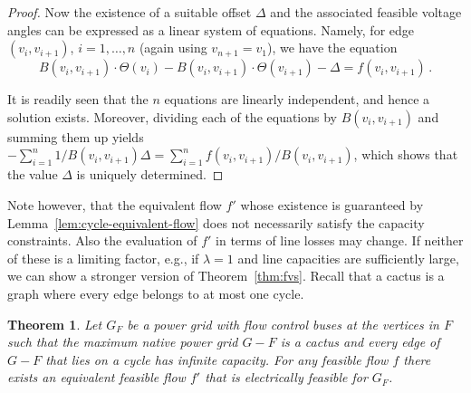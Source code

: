 \documentclass{article}[11pt,a4paper]
\newtheorem{theorem}{Theorem}[section]
\begin{document}
\begin{proof}
  Now the existence of a suitable offset $\Delta$ and the associated
  feasible voltage angles can be expressed as a linear system of equations.
  Namely, for edge $(v_i,v_{i+1})$, $i=1,\dots,n$ (again using
  $v_{n+1} = v_1$), we have the equation 
  \[B(v_i,v_{i+1}) \cdot
  \Theta(v_i) - B(v_i,v_{i+1}) \cdot \Theta(v_{i+1}) - \Delta =
  f(v_i,v_{i+1})\,.\] 
\iffalse
  \begin{figure*}[t]
    \centering
    $
    \begin{pmatrix}
      B(v_1,v_2) & - B(v_1,v_2) & 0 & \dots & 0\\
      0 &  B(v_2,v_3) & -B(v_2,v_3) & \dots & 0\\
      0 &  \multicolumn{2}{c}{\dots} & \ddots & \vdots\\
      -B(v_n,v_1) & \multicolumn{2}{c}{\dots} & B(v_n,v_1)
    \end{pmatrix}
    \begin{pmatrix}
      \Theta(u_1)\\
      \Theta(u_2)\\
      \vdots\\
      \Theta(v_n)\\
      \Delta
    \end{pmatrix}
    =
    \begin{pmatrix}
      f(v_1,v_2)\\
      f(v_2,v_3)\\
      \vdots\\
      f(v_n,v_1)\\
    \end{pmatrix}
    $
  \end{figure*}
\fi
It is readily seen that the $n$ equations are linearly independent,
and hence a solution exists.  Moreover, dividing each of the equations
by $B(v_i,v_{i+1})$ and summing them up yields $-\sum_{i=1}^n
1/B(v_i,v_{i+1})\Delta = \sum_{i=1}^nf(v_i,v_{i+1})/B(v_i,v_{i+1})$, which shows
  that the value $\Delta$ is uniquely determined.
\end{proof}
Note however, that the equivalent flow $f'$ whose existence is
guaranteed by Lemma~\ref{lem:cycle-equivalent-flow} does not
necessarily satisfy the capacity constraints. Also the evaluation of
$f'$ in terms of line losses may change.  If neither of these is a
limiting factor, e.g., if $\lambda = 1$ and line capacities are
sufficiently large, we can show a stronger version of
Theorem~\ref{thm:fvs}.  Recall that a cactus is a graph where every edge belongs
to at most one cycle.
\begin{theorem}
  \label{thm:cactus}
  Let $G_F$ be a power grid with flow control buses at the vertices in $F$ such
  that the maximum native power grid $G-F$ is a cactus  and every edge
  of $G-F$ that lies on a cycle has infinite capacity. For any feasible flow $f$ 
  there exists an equivalent feasible flow $f'$
  that is electrically feasible for $G_F$.
\end{theorem}
\end{document}
